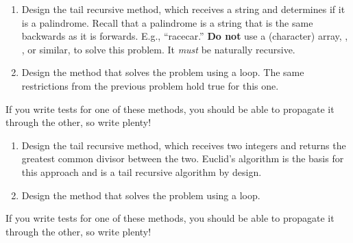 

\begin{enumerate}[label=(\alph*)]
    \item Design the  tail recursive method, which receives a string and determines if it is a palindrome. Recall that a palindrome is a string that is the same backwards as it is forwards. E.g., ``racecar.'' \textbf{Do not} use a (character) array, , , or similar, to solve this problem. It \emph{must} be naturally recursive.
    \item Design the  method that solves the problem using a loop. The same restrictions from the previous problem hold true for this one.
\end{enumerate}

If you write tests for one of these methods, you should be able to propagate it through the other, so write plenty!

\begin{enumerate}[label=(\alph*)]
    \item Design the  tail recursive method, which receives two integers and returns the greatest common divisor between the two. Euclid's algorithm is the basis for this approach and is a tail recursive algorithm by design.
    \item Design the  method that solves the problem using a loop.

\end{enumerate}
If you write tests for one of these methods, you should be able to propagate it through the other, so write plenty!


